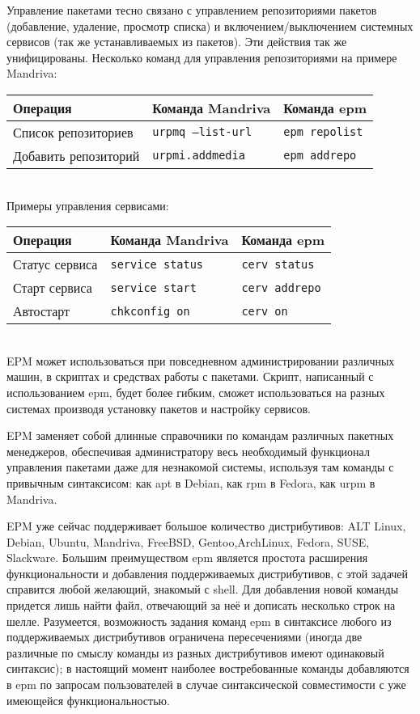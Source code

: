 \documentclass[10pt, a5paper]{article}
\def\vv!#1!{\texttt{#1}}
\begin{document}
Управление пакетами тесно связано с управлением репозиториями пакетов (добавление, удаление, просмотр списка) и включением/выключением системных сервисов (так же устанавливаемых из пакетов). Эти действия так же унифицированы. Несколько команд для управления репозиториями на примере Mandriva:

  \begin{tabular}{l|l|l}
    \hline
    Операция & Команда Mandriva & Команда epm \\
    \hline
    Список репозиториев & \vv!urpmq --list-url! & \vv!epm repolist! \\
    Добавить репозиторий & \vv!urpmi.addmedia! & \vv!epm addrepo! \\
    \hline
  \end{tabular}\\

\pagebreak Примеры управления сервисами:

  \begin{tabular}{l|l|l}
    \hline
    Операция & Команда Mandriva & Команда epm \\
    \hline
    Статус сервиса & \vv!service status! & \vv!cerv status! \\
    Старт сервиса & \vv!service start! & \vv!cerv addrepo! \\
    Автостарт & \vv!chkconfig on! & \vv!cerv on! \\
    \hline
  \end{tabular}\\

EPM может использоваться при повседневном администрировании различных машин, в скриптах и средствах работы с пакетами. Скрипт, написанный с использованием epm, будет более гибким, сможет использоваться на разных системах производя установку пакетов и настройку сервисов.

EPM заменяет собой длинные справочники по командам различных пакетных менеджеров, обеспечивая администратору весь необходимый функционал управления пакетами даже для незнакомой системы, используя там команды с привычным синтаксисом: как apt в Debian, как rpm в Fedora, как urpm в Mandriva.

EPM уже сейчас поддерживает большое количество дистрибутивов: ALT Linux, Debian, Ubuntu, Mandriva, FreeBSD, Gentoo,\linebreak ArchLinux, Fedora, SUSE, Slackware. Большим преимуществом epm является простота расширения функциональности и добавления поддерживаемых  дистрибутивов, с этой задачей справится любой желающий, знакомый с shell. Для добавления новой команды придется лишь найти файл, отвечающий за неё и дописать несколько строк на шелле.
Разумеется, возможность задания команд epm в синтаксисе любого из поддерживаемых дистрибутивов ограничена пересечениями (иногда две различные по смыслу команды из разных дистрибутивов имеют одинаковый синтаксис); в настоящий момент наиболее востребованные команды добавляются в epm по запросам пользователей в случае синтаксической совместимости с уже имеющейся функциональностью.
\end{document}

